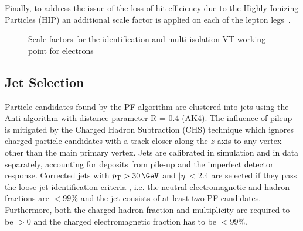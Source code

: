       Finally, to address the issue of the loss of hit efficiency due to the Highly Ionizing Particles (HIP) an additional scale factor is applied on each of the lepton legs~\cite{twiki:HIP}.

      \begin{figure}
	\centering
	\caption{Scale factors for the identification and multi-isolation VT working point for electrons}
	\label{fig:SF_e}
      \end{figure}

  \subsection{Jet Selection}
  Particle candidates found by the PF algorithm are clustered into jets using the Anti-\kt algorithm \citep{Cacciari:2008gp} with distance parameter R = 0.4 (AK4). The influence of pileup
  is mitigated by the Charged Hadron Subtraction (CHS) technique which ignores charged particle candidates with a track closer along the $z$-axis to any vertex other than the main primary vertex. 
  Jets are calibrated in simulation and in data separately, accounting for deposits from pile-up and the imperfect detector response.
  Corrected jets with $p_{\mathrm{T}}> 30\,\GeV$ and $|\eta|<2.4$ are selected if they pass the loose jet identification criteria \citep{twiki:jetId}, i.e. the neutral electromagnetic and hadron fractions
  are $<99\%$ and the jet consists of at least two PF candidates. Furthermore, both the charged hadron fraction and multiplicity are required to be $>0$ and the charged electromagnetic fraction has to be $<99\%$.

